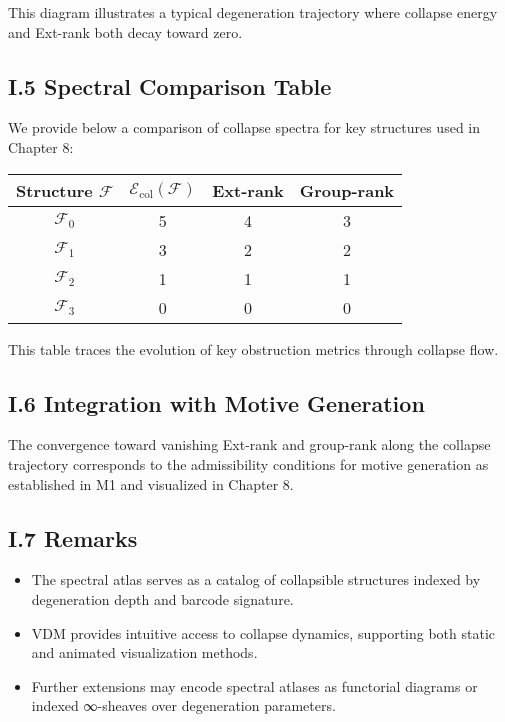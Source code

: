 \documentclass[11pt]{article}
\begin{document}
This diagram illustrates a typical degeneration trajectory where collapse energy and Ext-rank both decay toward zero.

\subsection*{I.5 Spectral Comparison Table}

We provide below a comparison of collapse spectra for key structures used in Chapter 8:

\begin{center}
\begin{tabular}{|c|c|c|c|}
\hline
Structure $\mathcal{F}$ & $\mathcal{E}_{\mathrm{col}}(\mathcal{F})$ & Ext-rank & Group-rank \\
\hline
$\mathcal{F}_0$ & 5 & 4 & 3 \\
$\mathcal{F}_1$ & 3 & 2 & 2 \\
$\mathcal{F}_2$ & 1 & 1 & 1 \\
$\mathcal{F}_3$ & 0 & 0 & 0 \\
\hline
\end{tabular}
\end{center}

This table traces the evolution of key obstruction metrics through collapse flow.

\subsection*{I.6 Integration with Motive Generation}

The convergence toward vanishing Ext-rank and group-rank along the collapse trajectory corresponds to the admissibility conditions for motive generation as established in M1 and visualized in Chapter 8.

\subsection*{I.7 Remarks}

\begin{itemize}
  \item The spectral atlas serves as a catalog of collapsible structures indexed by degeneration depth and barcode signature.
  \item VDM provides intuitive access to collapse dynamics, supporting both static and animated visualization methods.
  \item Further extensions may encode spectral atlases as functorial diagrams or indexed ∞-sheaves over degeneration parameters.
\end{itemize}
\end{document}
